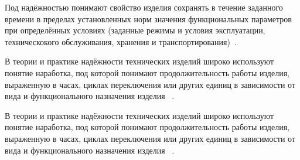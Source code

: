 
Под надёжностью понимают свойство изделия сохранять в течение
заданного времени в пределах установленных норм значения
функциональных параметров при определённых условиях (заданные режимы и
условия эксплуатации, техническокого обслуживания, хранения и
транспортирования)~\cite{Borovikov2010}.

В теории и практике надёжности технических изделий широко используют
понятие наработка, под которой понимают продолжительность работы
изделия, выраженную в часах, циклах переключения или других единиц в
зависимости от вида и функционального назначения изделия ~\cite{Borovikov2010}.

В теории и практике надёжности технических изделий широко используют
понятие наработка, под которой понимают продолжительность работы
изделия, выраженную в часах, циклах переключения или других единиц в
зависимости от вида и функционального назначения изделия ~\cite{Borovikov2010}.


